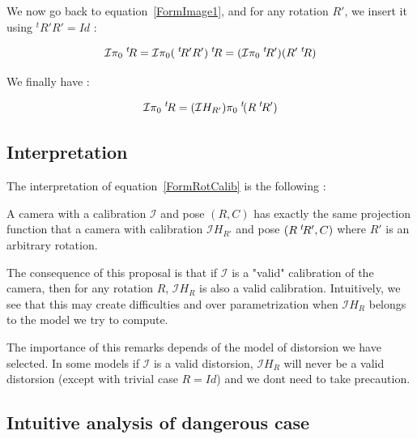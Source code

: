 We now go back to equation~\ref{FormImage1}, and for any rotation $R'$, we insert it using $^t R'R'=Id$ :

\begin{equation}
	\mathcal{I} \pi_0   \; ^{t} \! R = \mathcal{I}  \pi_0   (\; ^{t} \! R' R')  \; ^{t} \! R = ( \mathcal{I}  \pi_0   \; ^{t} \! R')  (R' \; ^{t} \! R )
\end{equation}

We finally have :

\begin{equation}
	   \mathcal{I} \pi_0   \; ^{t} \! R 
	   = (\mathcal{I} H_{R'})   \pi_0   \; ^{t} \! (R \; ^{t} \! R')  \label{FormRotCalib}
\end{equation}



\subsection{Interpretation}

The interpretation of equation~\ref{FormRotCalib} is the following : 

\begin{proposal}  \;
A camera with
a calibration $\mathcal{I}$ and pose $(R,C)$ has exactly the same projection
function that a camera with calibration $\mathcal{I} H_{R'}$ and pose $(R \; ^{t} \! R',C)$ where $R'$
is an arbitrary rotation.
\end{proposal}

The consequence of this proposal is that if $\mathcal{I}$ is a "valid" calibration of the
camera, then for any rotation $R$,  $\mathcal{I} H_{R}$ is also a valid calibration.
Intuitively, we see that this may create difficulties and over parametrization when
 $\mathcal{I} H_{R}$ belongs to the model we try to compute.

The importance of this remarks depends of the model of distorsion we have selected.
In some models if $\mathcal{I}$ is a valid distorsion,  $\mathcal{I} H_{R}$ will
never be a valid distorsion (except with trivial case $R=Id$) and we dont need
to take precaution.


\subsection{Intuitive analysis of dangerous case}

